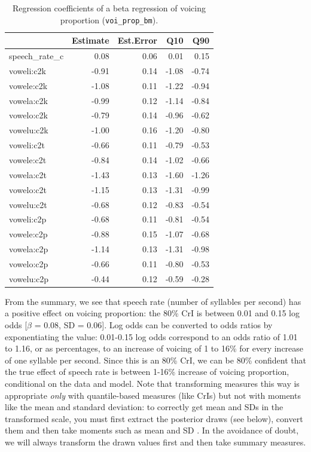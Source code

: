 \documentclass[
  authoryear,
  preprint,
  3p]{elsarticle}
\begin{document}
\begin{longtable}[]{@{}lrrrr@{}}

\caption{\label{tbl-voi-prop-fixef}Regression coefficients of a beta
regression of voicing proportion (\texttt{voi\_prop\_bm}).}

\tabularnewline

\toprule\noalign{}
& Estimate & Est.Error & Q10 & Q90 \\
\midrule\noalign{}
\endhead
\bottomrule\noalign{}
\endlastfoot
speech\_rate\_c & 0.08 & 0.06 & 0.01 & 0.15 \\
voweli:c2k & -0.91 & 0.14 & -1.08 & -0.74 \\
vowele:c2k & -1.08 & 0.11 & -1.22 & -0.94 \\
vowela:c2k & -0.99 & 0.12 & -1.14 & -0.84 \\
vowelo:c2k & -0.79 & 0.14 & -0.96 & -0.62 \\
vowelu:c2k & -1.00 & 0.16 & -1.20 & -0.80 \\
voweli:c2t & -0.66 & 0.11 & -0.79 & -0.53 \\
vowele:c2t & -0.84 & 0.14 & -1.02 & -0.66 \\
vowela:c2t & -1.43 & 0.13 & -1.60 & -1.26 \\
vowelo:c2t & -1.15 & 0.13 & -1.31 & -0.99 \\
vowelu:c2t & -0.68 & 0.12 & -0.83 & -0.54 \\
voweli:c2p & -0.68 & 0.11 & -0.81 & -0.54 \\
vowele:c2p & -0.88 & 0.15 & -1.07 & -0.68 \\
vowela:c2p & -1.14 & 0.13 & -1.31 & -0.98 \\
vowelo:c2p & -0.66 & 0.11 & -0.80 & -0.53 \\
vowelu:c2p & -0.44 & 0.12 & -0.59 & -0.28 \\

\end{longtable}

From the summary, we see that speech rate (number of syllables per
second) has a positive effect on voicing proportion: the 80\% CrI is
between 0.01 and 0.15 log odds {[}\(\beta\) = 0.08, SD = 0.06{]}. Log
odds can be converted to odds ratios by exponentiating the value:
0.01-0.15 log odds correspond to an odds ratio of 1.01 to 1.16, or as
percentages, to an increase of voicing of 1 to 16\% for every increase
of one syllable per second. Since this is an 80\% CrI, we can be 80\%
confident that the true effect of speech rate is between 1-16\% increase
of voicing proportion, conditional on the data and model. Note that
transforming measures this way is appropriate \emph{only} with
quantile-based measures (like CrIs) but not with moments like the mean
and standard deviation: to correctly get mean and SDs in the transformed
scale, you must first extract the posterior draws (see below), convert
them and then take moments such as mean and SD \citep[for a more
detailed explanation, see][p.~101]{burkner2025}. In the avoidance of
doubt, we will always transform the drawn values first and then take
summary measures.
\end{document}
